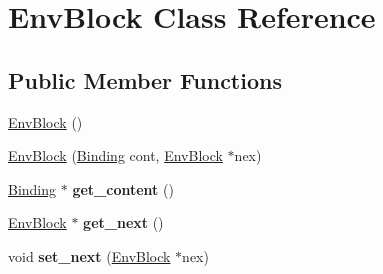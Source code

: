 \hypertarget{classEnvBlock}{\section{Env\-Block Class Reference}
\label{classEnvBlock}
}
\subsection*{Public Member Functions}
\begin{DoxyCompactItemize}
\item 
\hyperlink{classEnvBlock_a578ffa8ebc0161e6ec1bd014206de10f}{Env\-Block} ()
\item 
\hyperlink{classEnvBlock_a0158ee57b867427a39b8395af13629eb}{Env\-Block} (\hyperlink{classBinding}{Binding} cont, \hyperlink{classEnvBlock}{Env\-Block} $\ast$nex)
\item 
\hypertarget{classEnvBlock_a0860a0760290ddc69bdf14f766660c0c}{\hyperlink{classBinding}{Binding} $\ast$ {\bfseries get\-\_\-content} ()}\label{classEnvBlock_a0860a0760290ddc69bdf14f766660c0c}

\item 
\hypertarget{classEnvBlock_a03c712b1a137883e0ae303593c4c5e71}{\hyperlink{classEnvBlock}{Env\-Block} $\ast$ {\bfseries get\-\_\-next} ()}\label{classEnvBlock_a03c712b1a137883e0ae303593c4c5e71}

\item 
\hypertarget{classEnvBlock_a9c3c8875eca72db1bf042f9de83db78b}{void {\bfseries set\-\_\-next} (\hyperlink{classEnvBlock}{Env\-Block} $\ast$nex)}\label{classEnvBlock_a9c3c8875eca72db1bf042f9de83db78b}

\end{DoxyCompactItemize}


